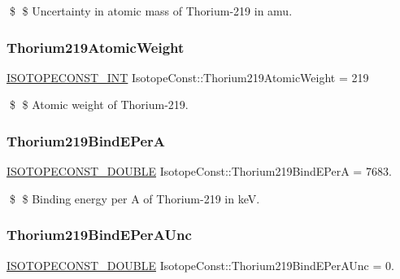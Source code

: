 \$ \$ Uncertainty in atomic mass of Thorium-\/219 in amu. \mbox{\label{group___isotope_const-_thorium-_th219_gaedcf9783431cb3ae135733c55868de37}} 
\subsubsection{\texorpdfstring{Thorium219\+Atomic\+Weight}{Thorium219AtomicWeight}}
{\footnotesize\ttfamily \mbox{\hyperlink{group___isotope_const-_macros_ga5f18360b3e99483a35c32d789e62621c}{I\+S\+O\+T\+O\+P\+E\+C\+O\+N\+S\+T\+\_\+\+I\+NT}} Isotope\+Const\+::\+Thorium219\+Atomic\+Weight = 219}

\$ \$ Atomic weight of Thorium-\/219. \mbox{\label{group___isotope_const-_thorium-_th219_ga51888340e3a002f24214f73e6da1b614}} 
\subsubsection{\texorpdfstring{Thorium219\+Bind\+E\+PerA}{Thorium219BindEPerA}}
{\footnotesize\ttfamily \mbox{\hyperlink{group___isotope_const-_macros_ga8f45a7272ce02c0b4c65c44636ed719a}{I\+S\+O\+T\+O\+P\+E\+C\+O\+N\+S\+T\+\_\+\+D\+O\+U\+B\+LE}} Isotope\+Const\+::\+Thorium219\+Bind\+E\+PerA = 7683.}

\$ \$ Binding energy per A of Thorium-\/219 in keV. \mbox{\label{group___isotope_const-_thorium-_th219_ga9579d3a819810c5b9ac6f3855d9abfa1}} 
\subsubsection{\texorpdfstring{Thorium219\+Bind\+E\+Per\+A\+Unc}{Thorium219BindEPerAUnc}}
{\footnotesize\ttfamily \mbox{\hyperlink{group___isotope_const-_macros_ga8f45a7272ce02c0b4c65c44636ed719a}{I\+S\+O\+T\+O\+P\+E\+C\+O\+N\+S\+T\+\_\+\+D\+O\+U\+B\+LE}} Isotope\+Const\+::\+Thorium219\+Bind\+E\+Per\+A\+Unc = 0.}

